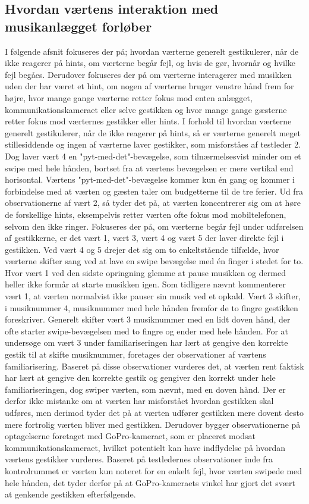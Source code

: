 \subsection{Hvordan værtens interaktion med musikanlægget forløber}
\label{TestresultaterSocialAcceptVaertsGestikker}
%
I følgende afsnit fokuseres der på; hvordan værterne generelt gestikulerer, når de ikke reagerer på hints, om værterne begår fejl, og hvis de gør, hvornår og hvilke fejl begåes. Derudover fokuseres der på om værterne interagerer med musikken uden der har været et hint, om nogen af værterne bruger venstre hånd frem for højre, hvor mange gange værterne retter fokus mod enten anlægget, kommunikationskameraet eller selve gestikken og hvor mange gange gæsterne retter fokus mod værternes gestikker eller hints.\blankline
%
I forhold til hvordan værterne generelt gestikulerer, når de ikke reagerer på hints, så er værterne generelt meget stillesiddende og ingen af værterne laver gestikker, som misforståes af testleder 2. Dog laver vært 4 en "pyt-med-det"-bevægelse, som tilnærmelsesvist minder om et swipe med hele hånden, bortset fra at værtens bevægelsen er mere vertikal end horisontal. Værtens "pyt-med-det"-bevægelse kommer kun én gang og kommer i forbindelse med at værten og gæsten taler om budgetterne til de tre ferier. Ud fra observationerne af vært 2, så tyder det på, at værten koncentrerer sig om at høre de forskellige hints, eksempelvis retter værten ofte fokus mod mobiltelefonen, selvom den ikke ringer.\blankline
%
Fokuseres der på, om værterne begår fejl under udførelsen af gestikkerne, er det vært 1, vært 3, vært 4 og vært 5 der laver direkte fejl i gestikken. Ved vært 4 og 5 drejer det sig om to enkeltstående tilfælde, hvor værterne skifter sang ved at lave en swipe bevægelse med én finger i stedet for to. Hvor vært 1 ved den sidste opringning glemme at pause musikken og dermed heller ikke formår at starte musikken igen. Som tidligere nævnt kommenterer vært 1, at værten normalvist ikke pauser sin musik ved et opkald. Vært 3 skifter, i musiknummer 4, musiknummer med hele hånden fremfor de to fingre gestikken foreskriver. Generelt skifter vært 3 musiknummer med en lidt doven hånd, der ofte starter swipe-bevægelsen med to fingre og ender med hele hånden. For at undersøge om vært 3 under familiariseringen har lært at gengive den korrekte gestik til at skifte musiknummer, foretages der observationer af værtens familiarisering. Baseret på disse observationer vurderes det, at værten rent faktisk har lært at gengive den korrekte gestik og gengiver den korrekt under hele familiariseringen, dog swiper værten, som nævnt, med en doven hånd. Der er derfor ikke mistanke om at værten har misforstået hvordan gestikken skal udføres, men derimod tyder det på at værten udfører gestikken mere dovent desto mere fortrolig værten bliver med gestikken. Derudover bygger observationerne på optagelserne foretaget med GoPro-kameraet, som er placeret modsat kommunikationskameraet, hvilket potentielt kan have indflydelse på hvordan værtens gestikker vurderes. Baseret på testledernes observationer inde fra kontrolrummet er værten kun noteret for en enkelt fejl, hvor værten swipede med hele hånden, det tyder derfor på at GoPro-kameraets vinkel har gjort det svært at genkende gestikken efterfølgende. 

